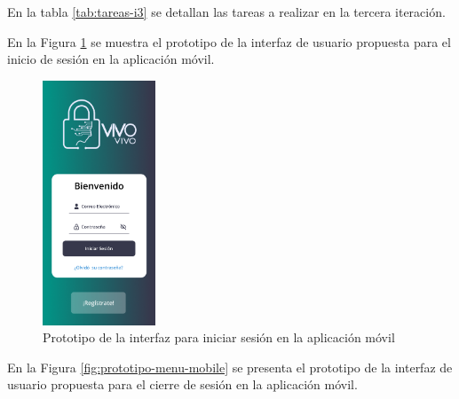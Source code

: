 

En la tabla \ref{tab:tareas-i3} se detallan las tareas a realizar en la tercera iteración.




En la Figura \ref{fig:prototipo-inicio-sesion-mobile} se muestra el prototipo de la interfaz de usuario propuesta para
el inicio de sesión en la aplicación móvil.

\begin{figure}[H]
      \centering
      \includegraphics[width=0.3\textwidth]{chapters/III-resultados-y-discusion/resources/images/prototipo-inicio-sesion-mobile.png}
      \caption{Prototipo de la interfaz para iniciar sesión en la aplicación móvil}
      \label{fig:prototipo-inicio-sesion-mobile}
\end{figure}

En la Figura \ref{fig:prototipo-menu-mobile} se presenta el prototipo de la interfaz de usuario propuesta para el cierre de sesión
en la aplicación móvil.

